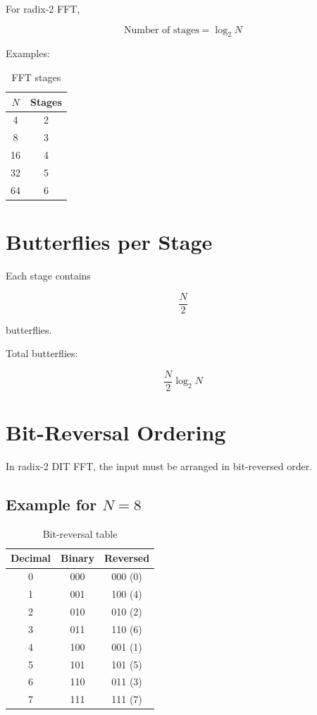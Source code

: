For radix-2 FFT,

\[
\boxed{
\text{Number of stages}=\log_2N
}
\]

Examples:

\begin{table}[H]
\centering
\caption{FFT stages}
\begin{tabular}{|c|c|}
\hline
\textbf{\(N\)} & \textbf{Stages}\\
\hline
4 & 2\\
8 & 3\\
16 & 4\\
32 & 5\\
64 & 6\\
\hline
\end{tabular}
\end{table}


\section{Butterflies per Stage}

Each stage contains

\[
\boxed{
\frac{N}{2}
}
\]

butterflies.

Total butterflies:

\[
\boxed{
\frac{N}{2}\log_2N
}
\]


\section{Bit-Reversal Ordering}

In radix-2 DIT FFT, the input must be arranged in bit-reversed order.


\subsection{Example for \(N=8\)}

\begin{table}[H]
\centering
\caption{Bit-reversal table}
\begin{tabular}{|c|c|c|}
\hline
\textbf{Decimal} & \textbf{Binary} & \textbf{Reversed}\\
\hline
0 & 000 & 000 (0)\\
1 & 001 & 100 (4)\\
2 & 010 & 010 (2)\\
3 & 011 & 110 (6)\\
4 & 100 & 001 (1)\\
5 & 101 & 101 (5)\\
6 & 110 & 011 (3)\\
7 & 111 & 111 (7)\\
\hline
\end{tabular}
\end{table}

